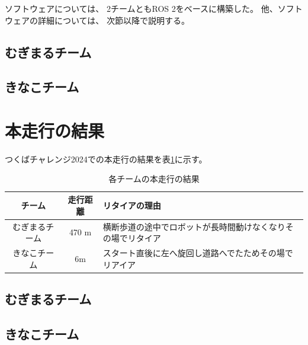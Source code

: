 \documentclass[twocolumn,9pt]{jsproceedings}
\begin{document}
ソフトウェアについては、
2チームともROS 2をベースに構築した。
他、ソフトウェアの詳細については、
次節以降で説明する。


\subsection{むぎまるチーム}


\subsection{きなこチーム}\label{sub:localization}




\section{本走行の結果}

つくばチャレンジ2024での本走行の結果を表\ref{MainRun}に示す。

\begin{table}[H]
  \caption{各チームの本走行の結果}
  \label{MainRun}
  \begin{tabular}{|c|c|p{4.0cm}|}
    \hline
    チーム         & 走行距離 & リタイアの理由                                                                                             \\
    \hline
    むぎまるチーム & 470 m    & 横断歩道の途中でロボットが長時間動けなくなりその場でリタイア\\
    \hline
    きなこチーム　 & 6m    & スタート直後に左へ旋回し道路へでたためその場でリアイア \\
    \hline
  \end{tabular}
\end{table}



\subsection{むぎまるチーム}


\subsection{きなこチーム}

\end{document}
